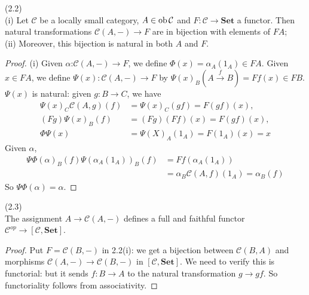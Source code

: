 \documentclass[a4paper]{article}
\begin{document}
\begin{lemma} (2.2)\\
    (i) Let $\mathcal{C}$ be a locally small category, $A \in \operatorname{ob} \mathcal{C}$ and $F:\mathcal{C} \to \mathbf{Set}$ a functor. Then natural transformations $\mathcal{C}(A,-) \to F$ are in bijection with elements of $FA$;\\
    (ii) Moreover, this bijection is natural in both $A$ and $F$.
    \begin{proof}
        (i) Given $\alpha$:$\mathcal{C}(A,-) \to F$, we define $\Phi(x) = \alpha_A(1_A) \in FA$. Given $x \in FA$, we define $\Psi(x): \mathcal{C}(A,-) \to F$ by $\Psi(x)_B (A \xrightarrow{f} B) = Ff(x) \in FB$.\\
        $\Psi(x)$ is natural: given $g:B \to C$, we have
        \begin{equation*}
            \begin{aligned}
                \Psi(x)_C \mathcal{C}(A,g) (f) &= \Psi(x)_C (gf) = F(gf)(x),\\
                (Fg) \Psi(x)_B(f) &= (Fg)(Ff)(x) = F(gf)(x),\\
                \Phi\Psi(x) &= \Psi(X)_A (1_A) = F(1_A)(x) = x
            \end{aligned}
        \end{equation*}
        Given $\alpha$,
        \begin{equation*}
            \begin{aligned}
                \Psi\Phi(\alpha)_B(f) \Psi(\alpha_A(1_A))_B(f) &= Ff(\alpha_A(1_A))\\
                &= \alpha_B\mathcal{C}(A,f)(1_A) = \alpha_B(f)
            \end{aligned}
        \end{equation*}
        So $\Psi\Phi(\alpha)=\alpha$.
    \end{proof}
\end{lemma}

\begin{coro} (2.3)\\
    The assignment $A \to \mathcal{C}(A,-)$ defines a full and faithful functor $\mathcal{C}^{op} \to [\mathcal{C},\mathbf{Set}]$.
    \begin{proof}
        Put $F = \mathcal{C}(B,-)$ in 2.2(i): we get a bijection between $\mathcal{C}(B,A)$ and morphisms $\mathcal{C}(A,-) \to \mathcal{C}(B,-)$ in $[\mathcal{C},\mathbf{Set}]$. We need to verify this is functorial: but it sends $f:B \to A$ to the natural transformation $g \to gf$. So functoriality follows from associativity.
    \end{proof}
\end{coro}
\end{document}
